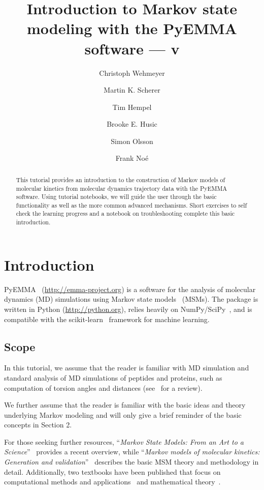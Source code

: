 \documentclass[9pt,tutorial]{livecoms}
\title{Introduction to Markov state modeling with the PyEMMA software --- v\versionnumber}
\author[1\authfn{1}*]{Christoph Wehmeyer}
\author[1\authfn{1}]{Martin K. Scherer}
\author[1\authfn{1}]{Tim Hempel}
\author[1,2]{Brooke E. Husic}
\author[1]{Simon Olsson}
\author[1*]{Frank Noé}
\affil[1]{Department of Mathematics and Computer Science, Freie Universität Berlin, Arnimallee 6, 14195 Berlin, Germany}
\affil[2]{Department of Chemistry, Stanford University, 333 Campus Drive, Stanford, California 94305, USA}
\begin{document}
\begin{frontmatter}
\maketitle

\begin{abstract}
This tutorial provides an introduction to the construction of Markov models of molecular kinetics from molecular dynamics trajectory data with the PyEMMA software.
Using tutorial notebooks, we will guide the user through the basic functionality as well as the more common advanced mechanisms.
Short exercises to self check the learning progress and a notebook on troubleshooting complete this basic introduction.
\end{abstract}

\end{frontmatter}

\section{Introduction}

PyEMMA~\cite{pyemma} (\url{http://emma-project.org}) is a software for the analysis of molecular dynamics (MD) simulations using Markov state models~\cite{schuette-msm,singhal-msm-naming,noe2007jcp,chodera2007jcp,buchete-msm-2008} (MSMs).
The package is written in Python (\url{http://python.org}), relies heavily on NumPy/SciPy~\cite{numpy,scipy}, and is compatible with the scikit-learn~\cite{sklearn} framework for machine learning.

\subsection{Scope}

In this tutorial, we assume that the reader is familiar with MD simulation and standard analysis of MD simulations of peptides and proteins, such as computation of torsion angles and distances (see~\cite{dror2012biomolecular} for a review).

We further assume that the reader is familiar with the basic ideas and theory underlying Markov modeling and will only give a brief reminder of the basic concepts in Section 2.

For those seeking further resources, ``\emph{Markov State Models: From an Art to a Science}''~\cite{msm-brooke} provides a recent overview,
while ``\emph{Markov models of molecular kinetics: Generation and validation}''~\cite{msm-jhp} describes the basic MSM theory and methodology in detail.
Additionally, two textbooks have been published that focus on computational methods and applications~\cite{msm-book} and mathematical theory~\cite{schuette-sarich-book}.
\end{document}
